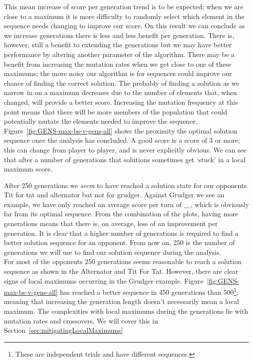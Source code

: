 This mean increase of score per generation trend is to be expected;
when we are close to a maximum it is more difficulty to randomly select which element in the sequence needs changing to improve our score.
On this result we can conclude as we increase generations there is less and less benefit per generation.
There is, however, still a benefit to extending the generations but we may have better performance by altering another parameter of the algorithm.
There may be a benefit from increasing the mutation rates when we get close to one of these maximums;
the more noisy our algorithm is for sequences could improve our chance of finding the correct solution.
The probably of finding a solution as we narrow in on a maximum decreases due to the number of elements that, when changed, will provide a better score.
Increasing the mutation frequency at this point means that there will be more members of the population that could potentially mutate the elements needed to improve the sequence.\\

Figure~\ref{fig:GENS-max-bs-v-gens-all} shows the proximity the optimal solution sequence once the analysis has concluded.
A good score is a score of 3 or more;
this can change from player to player, and is never explicitly obvious.
We can see that after a number of generations that solutions sometimes get `stuck' in a local maximum score.


After 250 generations we \textit{seem} to have reached a solution state for our opponents Tit for tat and alternator but not for grudger.
Against Grudger we see an example, we have only reached an average score per turn of $\_\_\_$, which is obviously far from its optimal sequence.
From the combination of the plots, having more generations means that there is, on average, less of an improvement per generation.
It is clear that a higher number of generations is required to find a better solution sequence for an opponent.
From now on, 250 is the number of generations we will use to find our solution sequence during the analysis.\\

For most of the opponents 250 generations seems reasonable to reach a solution sequence as shown in the Alternator and Tit For Tat.
However, there are clear signs of local maximums occurring in the Grudger example.
Figure~\ref{fig:GENS-max-bs-v-gens-all} has reached a better sequence in 450 generations than 500\footnote{These are independent trials and have different sequences.}; meaning that increasing the generation length doesn't necessarily mean a local maximum.
The complexities with local maximums during the generations lie with mutation rates and crossovers.
We will cover this in Section~\ref{sec:mitigatingLocalMaximums}\\

